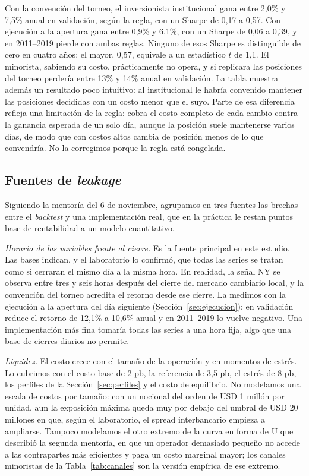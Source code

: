 \documentclass[11pt,a4paper]{article}
\begin{document}
Con la convención del torneo, el inversionista institucional gana entre 2,0\% y 7,5\% anual en validación, según la regla, con un Sharpe de 0,17 a 0,57. Con ejecución a la apertura gana entre 0,9\% y 6,1\%, con un Sharpe de 0,06 a 0,39, y en 2011--2019 pierde con ambas reglas. Ninguno de esos Sharpe es distinguible de cero en cuatro años: el mayor, 0,57, equivale a un estadístico \(t\) de 1,1. El minorista, sabiendo su costo, prácticamente no opera, y si replicara las posiciones del torneo perdería entre 13\% y 14\% anual en validación. La tabla muestra además un resultado poco intuitivo: al institucional le habría convenido mantener las posiciones decididas con un costo menor que el suyo. Parte de esa diferencia refleja una limitación de la regla: cobra el costo completo de cada cambio contra la ganancia esperada de un solo día, aunque la posición suele mantenerse varios días, de modo que con costos altos cambia de posición menos de lo que convendría. No la corregimos porque la regla está congelada.

\subsection{Fuentes de \emph{leakage}}\label{sec:leakage}
Siguiendo la mentoría del 6 de noviembre, agrupamos en tres fuentes las brechas entre el \emph{backtest} y una implementación real, que en la práctica le restan puntos base de rentabilidad a un modelo cuantitativo.

\emph{Horario de las variables frente al cierre.} Es la fuente principal en este estudio. Las bases indican, y el laboratorio lo confirmó, que todas las series se tratan como si cerraran el mismo día a la misma hora. En realidad, la señal NY se observa entre tres y seis horas después del cierre del mercado cambiario local, y la convención del torneo acredita el retorno desde ese cierre. La medimos con la ejecución a la apertura del día siguiente (Sección~\ref{sec:ejecucion}): en validación reduce el retorno de 12,1\% a 10,6\% anual y en 2011--2019 lo vuelve negativo. Una implementación más fina tomaría todas las series a una hora fija, algo que una base de cierres diarios no permite.

\emph{Liquidez.} El costo crece con el tamaño de la operación y en momentos de estrés. Lo cubrimos con el costo base de 2 pb, la referencia de 3,5 pb, el estrés de 8 pb, los perfiles de la Sección~\ref{sec:perfiles} y el costo de equilibrio. No modelamos una escala de costos por tamaño: con un nocional del orden de USD 1 millón por unidad, aun la exposición máxima queda muy por debajo del umbral de USD 20 millones en que, según el laboratorio, el spread interbancario empieza a ampliarse. Tampoco modelamos el otro extremo de la curva en forma de U que describió la segunda mentoría, en que un operador demasiado pequeño no accede a las contrapartes más eficientes y paga un costo marginal mayor; los canales minoristas de la Tabla~\ref{tab:canales} son la versión empírica de ese extremo.
\end{document}
